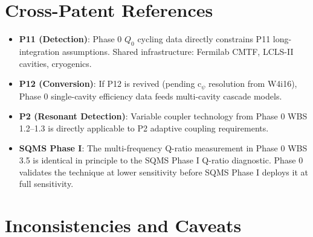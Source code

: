 \documentclass[11pt]{article}
\newcommand{\Qzero}{Q_0}
\begin{document}
\section{Cross-Patent References}

\begin{itemize}[nosep]
  \item \textbf{P11 (Detection)}: Phase 0 $\Qzero$ cycling data
    directly constrains P11 long-integration assumptions. Shared
    infrastructure: Fermilab CMTF, LCLS-II cavities, cryogenics.
  \item \textbf{P12 (Conversion)}: If P12 is revived (pending
    c$_\psi$ resolution from W4i16), Phase 0 single-cavity
    efficiency data feeds multi-cavity cascade models.
  \item \textbf{P2 (Resonant Detection)}: Variable coupler technology
    from Phase 0 WBS 1.2--1.3 is directly applicable to P2 adaptive
    coupling requirements.
  \item \textbf{SQMS Phase I}: The multi-frequency Q-ratio
    measurement in Phase 0 WBS 3.5 is identical in principle to the
    SQMS Phase I Q-ratio diagnostic. Phase 0 validates the technique
    at lower sensitivity before SQMS Phase I deploys it at full
    sensitivity.
\end{itemize}

\section{Inconsistencies and Caveats}
\end{document}
